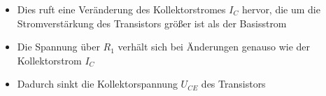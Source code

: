\begin{frame}
\begin{columns}
{\begin{itemize}
      \item Dies ruft eine Veränderung des Kollektorstromes $I_C$ hervor, die um die Stromverstärkung des Transistors größer ist als der Basisstrom
      \item Die Spannung über $R_1$ verhält sich bei Änderungen genauso wie der Kollektorstrom $I_C$
      \item Dadurch sinkt die Kollektorspannung $U_{CE}$ des Transistors
    \end{itemize}
    }
  \end{columns}
\end{frame}

